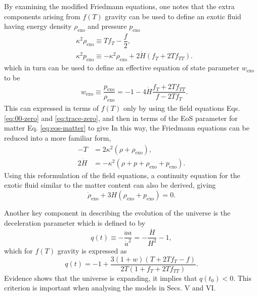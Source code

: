 \documentclass[prl,floatfix,showpacs,twocolumn,preprintnumbers,amsmath,amssymb,superscriptaddress]{revtex4}
\begin{document}
By examining the modified Friedmann equations, one notes that the extra components arising from $f(T)$ gravity can be used to define an exotic fluid having energy density $\rho_{\text{exo}}$ and pressure $p_{\text{exo}}$
\begin{align}
&\kappa^2 \rho_{\text{exo}} \equiv Tf_T - \dfrac{f}{2}, \label{eq:def-DE-energy-density} \\
&\kappa^2 p_{\text{exo}} \equiv -\kappa^2 \rho_{\text{exo}} + 2\dot{H}\left(f_T+2T f_{TT}\right). \label{eq:def-DE-pressure}
\end{align}
which in turn can be used to define an effective equation of state parameter $w_{\text{exo}}$ to be
\begin{align}
&w_{\text{exo}} \equiv \dfrac{p_{\text{exo}}}{\rho_{\text{exo}}} = -1 - 4\dot{H}\dfrac{f_T+2T f_{TT}}{f-2Tf_T}.
\end{align}
This can expressed in terms of $f(T)$ only by using the field equations Eqs. \eqref{eq:00-zero} and \eqref{eq:trace-zero}, and then in terms of the EoS parameter for matter Eq. \eqref{eq:eos-matter} to give
In this way, the Friedmann equations can be reduced into a more familiar form, 
\begin{align}
-T &= 2\kappa^2 \left(\rho + \rho_{\text{exo}}\right), \\ 
2\dot{H} &= -\kappa^2 \left(\rho+p+\rho_{\text{exo}} + p_{\text{exo}}\right).
\end{align}
Using this reformulation of the field equations, a continuity equation for the exotic fluid similar to the matter content can also be derived, giving
\begin{equation}
\dot{\rho}_{\text{exo}} + 3H\left(\rho_{\text{exo}} + p_{\text{exo}}\right) = 0.
\end{equation}

Another key component in describing the evolution of the universe is the deceleration parameter which is defined to by
\begin{equation}\label{eq:def-deceleration-parameter}
q(t) \equiv -\dfrac{\ddot{a}a}{{\dot{a}}^2} = -\dfrac{\dot{H}}{H^2} -1,
\end{equation}
which for $f(T)$ gravity is expressed as
\begin{equation}
q(t) = -1+\frac{3 (1+w) \left(T+2 T f_T-f\right)}{2 T \left(1+f_T+2 T f_{TT}\right)}.
\end{equation}
Evidence shows that the universe is expanding, it implies that $q\left(t_0\right) < 0$. This criterion is important when analysing the models in Secs. V and VI.
\end{document}
